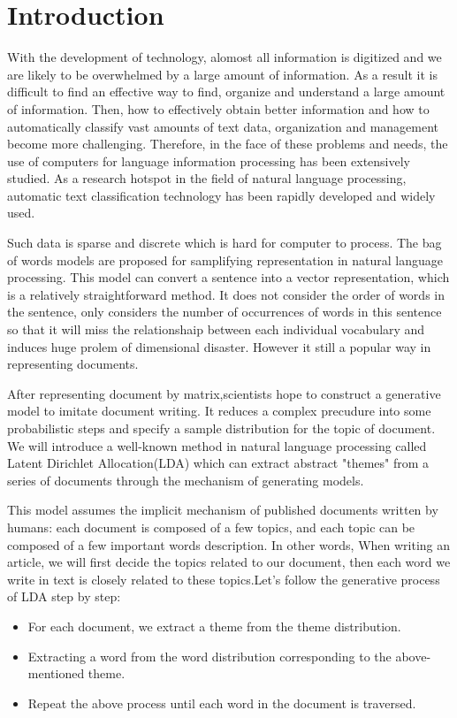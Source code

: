 \afterpage{\blankpage}

\chapter{Introduction}\label{s-intro}


With the development of technology, alomost all information is digitized and we are  likely to be overwhelmed by a large amount of information. As a result it is difficult to find an effective way to find, organize and understand a large amount of information{\cite{intro-back}}. Then, how to effectively obtain better information and how to automatically classify vast amounts of text data, organization and management become more challenging. Therefore, in the face of these problems and needs, the use of computers for language information processing has been extensively studied. As a research hotspot in the field of natural language processing, automatic text classification technology has been rapidly developed and widely used.


Such data is sparse and discrete which is hard for computer to process. The bag of words models are proposed for samplifying representation in natural language processing. This model can convert a sentence into a vector representation, which is a relatively straightforward method. It does not consider the order of words in the sentence, only considers the number of occurrences of words  in this sentence so that it will miss the relationshaip between each individual vocabulary and induces huge prolem of dimensional disaster. However it still a popular way in representing documents.

After representing document by matrix,scientists hope to construct a generative model to
imitate document writing. It reduces a complex precudure into some probabilistic steps and specify a sample  distribution for the topic of  document\cite{find}. We will introduce  a  well-known method in natural language processing called Latent Dirichlet Allocation(LDA) which can extract  abstract "themes"  from a series of documents through the mechanism of generating models.


This model assumes the implicit mechanism of published documents written by humans: each document is composed of a few topics, and each topic can be composed of a few important words description. In other words, When writing an article, we will first decide the topics related to our document, then each word we write in text is closely related to these topics.Let's follow the generative process of LDA step by step:
\begin{itemize}
  \item For each document, we extract a theme from the theme distribution.
  \item Extracting a word from the word distribution corresponding to the above-mentioned theme.
  \item Repeat the above process until each word in the document is traversed.
\end{itemize}

